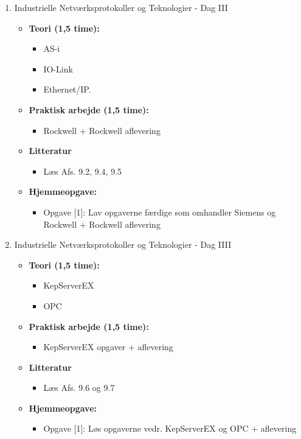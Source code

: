 \documentclass[12pt,a4paper]{article}
\begin{document}
\begin{enumerate}[leftmargin=*, label=\textbf{Dag \arabic* (3 timer)}]
		\item Industrielle Netværksprotokoller og Teknologier - Dag III
		\begin{itemize}
			\item \textbf{Teori (1,5 time):}
			\begin{itemize}
				\item AS-i
				\item IO-Link
				\item Ethernet/IP.
			\end{itemize}
			\item \textbf{Praktisk arbejde (1,5 time):}
			\begin{itemize}
				\item Rockwell + Rockwell aflevering
			\end{itemize}
			\item \textbf{Litteratur}
			\begin{itemize}
				\item Læs Afs. 9.2, 9.4, 9.5
			\end{itemize}
			\item \textbf{Hjemmeopgave:}
			\begin{itemize}
				\item Opgave [1]: Lav opgaverne færdige som omhandler Siemens og Rockwell + Rockwell aflevering
			\end{itemize}
		\end{itemize}

		\item Industrielle Netværksprotokoller og Teknologier - Dag IIII
		\begin{itemize}
			\item \textbf{Teori (1,5 time):}
			\begin{itemize}
				\item KepServerEX
				\item OPC
			\end{itemize}
			\item \textbf{Praktisk arbejde (1,5 time):}
			\begin{itemize}
				\item KepServerEX opgaver + aflevering
			\end{itemize}
			\item \textbf{Litteratur}
			\begin{itemize}
				\item Læs Afs. 9.6 og 9.7
			\end{itemize}
			\item \textbf{Hjemmeopgave:}
			\begin{itemize}
				\item Opgave [1]: Løs opgaverne vedr. KepServerEX og OPC + aflevering
			\end{itemize}
		\end{itemize}
		

\end{enumerate}
\end{document}
